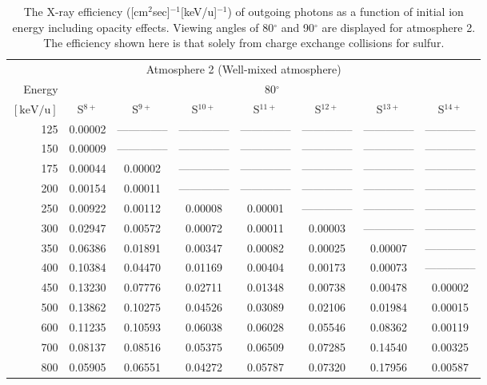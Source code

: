\begin{table}[ht]
    \centering
    \caption{The X-ray efficiency ([cm$^2$sec]$^{-1}$[keV/u]$^{-1}$) of outgoing photons as a function of initial ion energy including opacity effects. Viewing angles of 80$^\circ$ and 90$^\circ$ are displayed for atmosphere 2. The efficiency shown here is that solely from charge exchange collisions for sulfur.}
    \begin{tabular}{r|c|c|c|c|c|c|c}
    \multicolumn{8}{c}{Atmosphere 2 (Well-mixed atmosphere)} \\ \cline{2-8}
    Energy & \multicolumn{7}{c}{80$^\circ$} \\ \cline{2-8}
    $\mathrm{[keV/u]}$ & S$^{8+}$ & S$^{9+}$ & S$^{10+}$ & S$^{11+}$ & S$^{12+}$ & S$^{13+}$ & S$^{14+}$ \\ \cline{1-8}
      125 & 0.00002 & -------------- & -------------- & -------------- & -------------- & -------------- & -------------- \\
      150 & 0.00009 & -------------- & -------------- & -------------- & -------------- & -------------- & -------------- \\
      175 & 0.00044 & 0.00002 & -------------- & -------------- & -------------- & -------------- & -------------- \\
      200 & 0.00154 & 0.00011 & -------------- & -------------- & -------------- & -------------- & -------------- \\
      250 & 0.00922 & 0.00112 & 0.00008 & 0.00001 & -------------- & -------------- & -------------- \\
      300 & 0.02947 & 0.00572 & 0.00072 & 0.00011 & 0.00003 & -------------- & -------------- \\
      350 & 0.06386 & 0.01891 & 0.00347 & 0.00082 & 0.00025 & 0.00007 & -------------- \\
      400 & 0.10384 & 0.04470 & 0.01169 & 0.00404 & 0.00173 & 0.00073 & -------------- \\
      450 & 0.13230 & 0.07776 & 0.02711 & 0.01348 & 0.00738 & 0.00478 & 0.00002 \\
      500 & 0.13862 & 0.10275 & 0.04526 & 0.03089 & 0.02106 & 0.01984 & 0.00015 \\
      600 & 0.11235 & 0.10593 & 0.06038 & 0.06028 & 0.05546 & 0.08362 & 0.00119 \\
      700 & 0.08137 & 0.08516 & 0.05375 & 0.06509 & 0.07285 & 0.14540 & 0.00325 \\
      800 & 0.05905 & 0.06551 & 0.04272 & 0.05787 & 0.07320 & 0.17956 & 0.00587 \\

\end{tabular}
\end{table}

